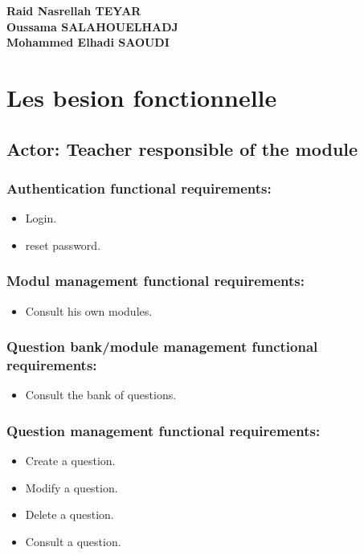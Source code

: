 \documentclass[a4paper,12p]{article}
\begin{document}


     \begin{center}
        \textbf{Raid Nasrellah TEYAR} \\
        \textbf{Oussama SALAHOUELHADJ} \\
        \textbf{Mohammed Elhadi SAOUDI} \\
    \end{center}

     \raggedright\section{Les besion fonctionnelle}

    
     \subsection{Actor: Teacher responsible of the module}
        \subsubsection{Authentication functional requirements:}
        \begin{itemize}
            \item Login.
            \item reset password.
        \end{itemize}

        \subsubsection{Modul management functional requirements:}
        \begin{itemize}
            \item Consult his own modules.
        \end{itemize}

        \subsubsection{Question bank/module management functional requirements:}
        \begin{itemize}
            \item Consult the bank of questions.
        \end{itemize}

        \subsubsection{Question management functional requirements:}
        \begin{itemize}
            \item Create a question.
            \item Modify a question.
            \item Delete a question.
            \item Consult a question.
        \end{itemize}
\end{document}
